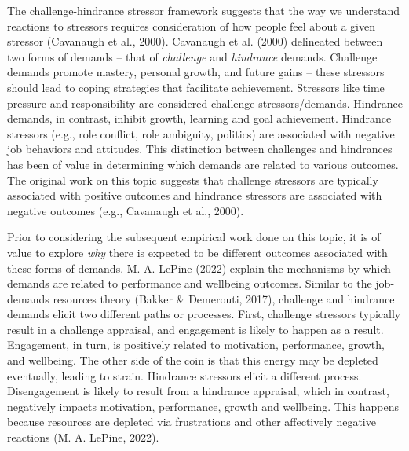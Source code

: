 \documentclass[
  man]{apa6}
\begin{document}
The challenge-hindrance stressor framework suggests that the way we understand reactions to stressors requires consideration of how people feel about a given stressor (Cavanaugh et al., 2000). Cavanaugh et al. (2000) delineated between two forms of demands -- that of \emph{challenge} and \emph{hindrance} demands. Challenge demands promote mastery, personal growth, and future gains -- these stressors should lead to coping strategies that facilitate achievement. Stressors like time pressure and responsibility are considered challenge stressors/demands. Hindrance demands, in contrast, inhibit growth, learning and goal achievement. Hindrance stressors (e.g., role conflict, role ambiguity, politics) are associated with negative job behaviors and attitudes. This distinction between challenges and hindrances has been of value in determining which demands are related to various outcomes. The original work on this topic suggests that challenge stressors are typically associated with positive outcomes and hindrance stressors are associated with negative outcomes (e.g., Cavanaugh et al., 2000).

Prior to considering the subsequent empirical work done on this topic, it is of value to explore \emph{why} there is expected to be different outcomes associated with these forms of demands. M. A. LePine (2022) explain the mechanisms by which demands are related to performance and wellbeing outcomes. Similar to the job-demands resources theory (Bakker \& Demerouti, 2017), challenge and hindrance demands elicit two different paths or processes. First, challenge stressors typically result in a challenge appraisal, and engagement is likely to happen as a result. Engagement, in turn, is positively related to motivation, performance, growth, and wellbeing. The other side of the coin is that this energy may be depleted eventually, leading to strain. Hindrance stressors elicit a different process. Disengagement is likely to result from a hindrance appraisal, which in contrast, negatively impacts motivation, performance, growth and wellbeing. This happens because resources are depleted via frustrations and other affectively negative reactions (M. A. LePine, 2022).
\end{document}
